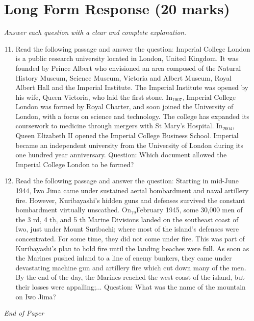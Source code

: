 \documentclass[12pt]{article}
\begin{document}
\section*{Long Form Response (20 marks)}
\textit{Answer each question with a clear and complete explanation.}
\begin{enumerate}[label=\arabic*.]
\setcounter{enumi}{10}
\item Read the following passage and answer the question: Imperial College London is a public research university located in London, United Kingdom. It was founded by Prince Albert who envisioned an area composed of the Natural History Museum, Science Museum, Victoria and Albert Museum, Royal Albert Hall and the Imperial Institute. The Imperial Institute was opened by his wife, Queen Victoria, who laid the first stone. In$_{1907}$, Imperial College London was formed by Royal Charter, and soon joined the University of London, with a focus on science and technology. The college has expanded its coursework to medicine through mergers with St Mary's Hospital. In$_{2004}$, Queen Elizabeth II opened the Imperial College Business School. Imperial became an independent university from the University of London during its one hundred year anniversary. Question: Which document allowed the Imperial College London to be formed?
\item Read the following passage and answer the question: Starting in mid-June 1944, Iwo Jima came under sustained aerial bombardment and naval artillery fire. However, Kuribayashi's hidden guns and defenses survived the constant bombardment virtually unscathed. On$_{19}$February 1945, some 30,000 men of the 3 rd, 4 th, and 5 th Marine Divisions landed on the southeast coast of Iwo, just under Mount Suribachi; where most of the island's defenses were concentrated. For some time, they did not come under fire. This was part of Kuribayashi's plan to hold fire until the landing beaches were full. As soon as the Marines pushed inland to a line of enemy bunkers, they came under devastating machine gun and artillery fire which cut down many of the men. By the end of the day, the Marines reached the west coast of the island, but their losses were appalling;... Question: What was the name of the mountain on Iwo Jima?
\end{enumerate}

\vfill
\noindent\textit{End of Paper}
\end{document}
